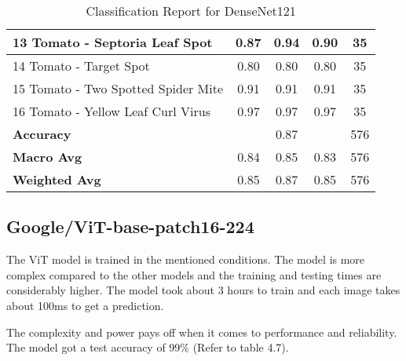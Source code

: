\begin{table}[h!]
{\begin{tabular}{|l|c|c|c|c|}
    13 Tomato - Septoria Leaf Spot                    & 0.87               & 0.94            & 0.90              & 35               \\ \hline
    14 Tomato - Target Spot                           & 0.80               & 0.80            & 0.80              & 35               \\ \hline
    15 Tomato - Two Spotted Spider Mite               & 0.91               & 0.91            & 0.91              & 35               \\ \hline
    16 Tomato - Yellow Leaf Curl Virus                & 0.97               & 0.97            & 0.97              & 35               \\ \hline
    \textbf{Accuracy}                                 & \multicolumn{3}{c|}{0.87}            & 576              \\ \hline
    \textbf{Macro Avg}                                & 0.84               & 0.85            & 0.83              & 576              \\ \hline
    \textbf{Weighted Avg}                             & 0.85               & 0.87            & 0.85              & 576              \\ \hline
    \end{tabular}%
    }
    \caption{Classification Report for DenseNet121}
    \label{tab:classification_report_dn121}
    \end{table}

\subsection{Google/ViT-base-patch16-224}

The ViT model is trained in the mentioned conditions. The model is more complex compared to the other models and the training and testing times are considerably higher. The model took about 3 hours to train and each image takes about 100ms to get a prediction.

The complexity and power pays off when it comes to performance and reliability. The model got a test accuracy of 99\% (Refer to table 4.7).

